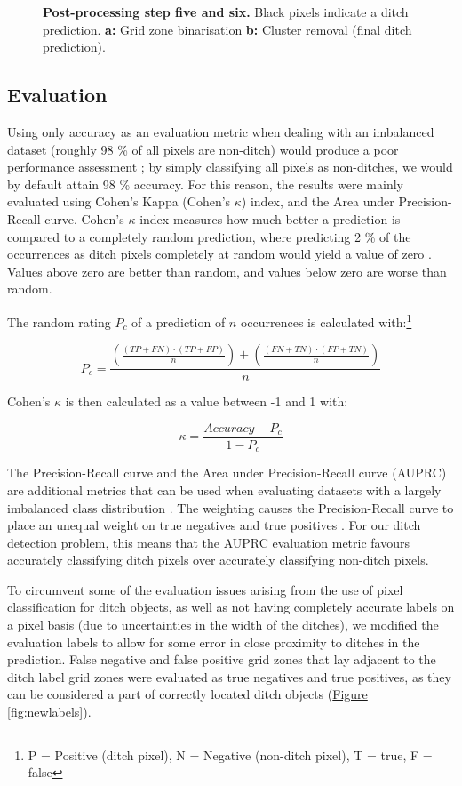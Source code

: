 \documentclass[11pt, review]{elsarticle} %
\begin{document}
\begin{figure} [!htb]
    \caption{\textbf{Post-processing step five and six.} Black pixels indicate a ditch prediction. \textbf{a: }Grid zone binarisation \textbf{b: }Cluster removal (final ditch prediction).}
    \label{fig:postprocessing3}
\end{figure}

\subsection{Evaluation} \label{evaluation}

Using only accuracy as an evaluation metric when dealing with an imbalanced dataset (roughly 98 \% of all pixels are non-ditch) would produce a poor performance assessment \citep{balanced}; by simply classifying all pixels as non-ditches, we would by default attain 98 \% accuracy. For this reason, the results were mainly evaluated using Cohen's Kappa (Cohen's $\kappa$) index, and the Area under Precision-Recall curve. Cohen's $\kappa$ index measures how much better a prediction is compared to a completely random prediction, where predicting 2 \% of the occurrences as ditch pixels completely at random would yield a value of zero \citep{kappa123}. Values above zero are better than random, and values below zero are worse than random.

The random rating $P_c$ of a prediction of $n$ occurrences is calculated with:\footnote{ P = Positive (ditch pixel), N = Negative (non-ditch pixel), T = true, F = false}

$$
P_c = \frac{\left(\frac{(TP + FN) \cdot (TP + FP)}{n}\right) + \left(\frac{(FN + TN) \cdot (FP + TN)}{n}\right)}{n}
$$


Cohen's $\kappa$ is then calculated as a value between -1 and 1 with:

$$\kappa = \frac{Accuracy - P_c}{1 - P_c}$$

The Precision-Recall curve and the Area under Precision-Recall curve (AUPRC) are additional metrics that can be used when evaluating datasets with a largely imbalanced class distribution \citep{precision_recall_curve}. The weighting causes the Precision-Recall curve to place an unequal weight on true negatives and true positives \citep{precision_recall_curve}. For our ditch detection problem, this means that the AUPRC evaluation metric favours accurately classifying ditch pixels over accurately classifying non-ditch pixels.

To circumvent some of the evaluation issues arising from the use of pixel classification for ditch objects, as well as not having completely accurate labels on a pixel basis (due to uncertainties in the width of the ditches), we modified the evaluation labels to allow for some error in close proximity to ditches in the prediction. False negative and false positive grid zones that lay adjacent to the ditch label grid zones were evaluated as true negatives and true positives, as they can be considered a part of correctly located ditch objects (\hyperref[fig:newlabels]{Figure} \ref{fig:newlabels}).
\end{document}
